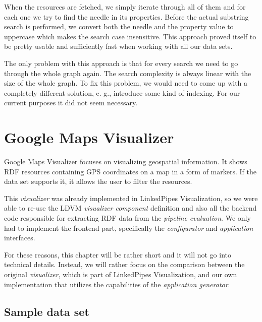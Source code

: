 When the resources are fetched, we simply iterate through all of them and for each one we try to find the needle in its properties. Before the actual substring search is performed, we convert both the needle and the property value to uppercase which makes the search case insensitive. This approach proved itself to be pretty usable and sufficiently fast when working with all our data sets.

The only problem with this approach is that for every search we need to go through the whole graph again. The search complexity is always linear with the size of the whole graph. To fix this problem, we would need to come up with a completely different solution, e. g., introduce some kind of indexing. For our current purposes it did not seem necessary.

\section{Google Maps Visualizer}
\label{sec:visualizers:google-maps}
%
%
%
Google Maps Visualizer focuses on visualizing geospatial information. It shows RDF resources containing GPS coordinates on a map in a form of markers. If the data set supports it, it allows the user to filter the resources.

This \emph{visualizer} was already implemented in LinkedPipes Visualization, so we were able to re-use the LDVM \emph{visualizer component} definition and also all the backend code responsible for extracting RDF data from the \emph{pipeline evaluation}. We only had to implement the frontend part, specifically the \emph{configurator} and \emph{application} interfaces.

For these reasons, this chapter will be rather short and it will not go into technical details. Instead, we will rather focus on the comparison between the original \emph{visualizer}, which is part of LinkedPipes Visualization, and our own implementation that utilizes the capabilities of the \emph{application generator}. 

\subsection{Sample data set}


